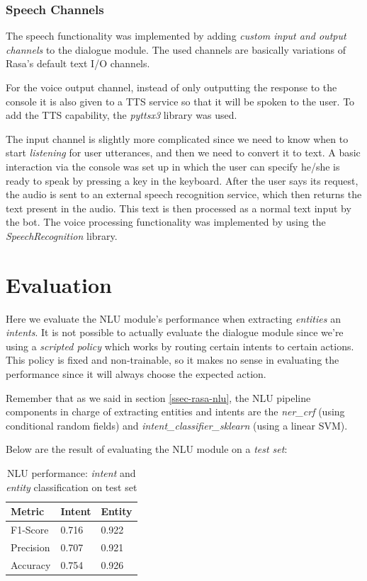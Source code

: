 \documentclass[11pt,a4paper]{article}
\begin{document}
		\subsubsection{Speech Channels}
		\label{sec-speech}
		
			The speech functionality was implemented by adding \textit{custom input and output channels} to the dialogue module. The used channels are basically variations of Rasa's default text I/O channels. 
			
			For the voice output channel, instead of only outputting the response to the console it is also given to a TTS service so that it will be spoken to the user. To add the TTS capability, the \textit{pyttsx3} \cite{ttspy} library was used.
			
			The input channel is slightly more complicated since we need to know when to start \textit{listening} for user utterances, and then we need to convert it to text. A basic interaction via the console was set up in which the user can specify he/she is ready to speak by pressing a key in the keyboard. After the user says its request, the audio is sent to an external speech recognition service, which then returns the text present in the audio. This text is then processed as a normal text input by the bot. The voice processing functionality was implemented by using the \textit{SpeechRecognition} \cite{SpeechRecognition} library.
			
			
\section{Evaluation}
\label{sec-evaluation}

	Here we evaluate the NLU module's performance when extracting \textit{entities} an \textit{intents}. It is not possible to actually evaluate the dialogue module since we're using a \textit{scripted policy} which works by routing certain intents to certain actions. This policy is fixed and non-trainable, so it makes no sense in evaluating the performance since it will always choose the expected action. 
	
	Remember that as we said in section \ref{ssec-rasa-nlu}, the NLU pipeline components in charge of extracting entities and intents are the \textit{ner\_crf} (using conditional random fields) and \textit{intent\_classifier\_sklearn} (using a linear SVM).
	
	Below are the result of evaluating the NLU module on a \textit{test set}:
	
	\begin{table}[h!]
		\centering
		\begin{tabular}{l|l|l}
			\textbf{Metric} & \textbf{Intent} & \textbf{Entity} \\ 
			\hline 
			F1-Score & 0.716 & 0.922 \\ 
			\hline 
			Precision & 0.707 & 0.921 \\ 
			\hline 
			Accuracy & 0.754 & 0.926\\ 
			\hline 
		\end{tabular} 
		\caption{NLU performance: \textit{intent} and \textit{entity} classification on test set}
		\label{table:1}
	\end{table}
		
\end{document}
